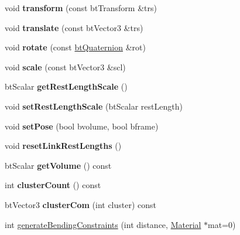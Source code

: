 \begin{DoxyCompactItemize}
\item 
\mbox{\label{classbtSoftBody_a7ab01480d2dcebf21db52e65d0d8b891}} 
void {\bfseries transform} (const bt\+Transform \&trs)
\item 
\mbox{\label{classbtSoftBody_af412dc4d210f98a36a14b2d17d80e00e}} 
void {\bfseries translate} (const bt\+Vector3 \&trs)
\item 
\mbox{\label{classbtSoftBody_a45e297c3090eee78c3d539eadfa86a50}} 
void {\bfseries rotate} (const \hyperlink{classbtQuaternion}{bt\+Quaternion} \&rot)
\item 
\mbox{\label{classbtSoftBody_a2a6533511a6a6cbede9bacb5c9a5280c}} 
void {\bfseries scale} (const bt\+Vector3 \&scl)
\item 
\mbox{\label{classbtSoftBody_acaa15e077df8edbac940db7f3f982965}} 
bt\+Scalar {\bfseries get\+Rest\+Length\+Scale} ()
\item 
\mbox{\label{classbtSoftBody_a3e1ada2e78146ba2414ac2581dd4f460}} 
void {\bfseries set\+Rest\+Length\+Scale} (bt\+Scalar rest\+Length)
\item 
\mbox{\label{classbtSoftBody_a13672a0c23f4b2af774ed83a6457cbef}} 
void {\bfseries set\+Pose} (bool bvolume, bool bframe)
\item 
\mbox{\label{classbtSoftBody_afaf8cbc96cb174bb9b9937c5eb42c921}} 
void {\bfseries reset\+Link\+Rest\+Lengths} ()
\item 
\mbox{\label{classbtSoftBody_a30d5fcc3998e6eff5fb7af2a4032afaa}} 
bt\+Scalar {\bfseries get\+Volume} () const
\item 
\mbox{\label{classbtSoftBody_afc1f03e3c88e908f9a4f3dec91ff4014}} 
int {\bfseries cluster\+Count} () const
\item 
\mbox{\label{classbtSoftBody_afa4d16677518ab82939b841772c2ca86}} 
bt\+Vector3 {\bfseries cluster\+Com} (int cluster) const
\item 
int \hyperlink{classbtSoftBody_af31b03f0ff5eecec1ec9eee5a7582d20}{generate\+Bending\+Constraints} (int distance, \hyperlink{structbtSoftBody_1_1Material}{Material} $\ast$mat=0)

\end{DoxyCompactItemize}
